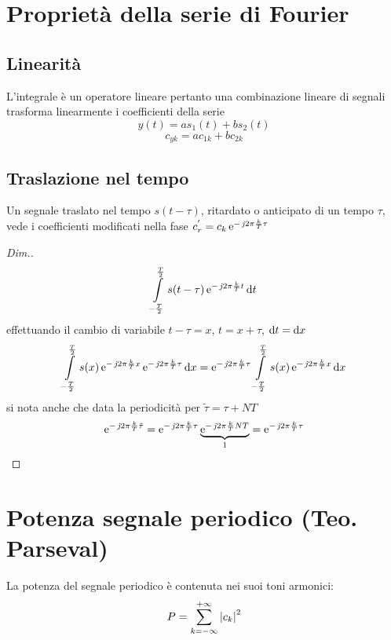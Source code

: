 \section{Proprietà della serie di Fourier}
\subsection{Linearità}L'integrale è un operatore lineare pertanto una combinazione lineare di segnali trasforma linearmente i coefficienti della serie
\[ y(t)=a s_1(t)+ b s_2(t)\]
\[ c_{y k}= a c_{1 k} + b c_{2 k} \]

\subsection{Traslazione nel tempo}
Un segnale traslato nel tempo $s(t-\tau)$, ritardato o anticipato di un tempo $\tau$, vede i coefficienti modificati nella fase $c_r^{'}=c_k \operatorname{e}^{-\operatorname{\mathit{j}\!} 2\pi\frac{k}{T}\tau}$

\begin{proof}[Dim.]
\[ \int\limits_{-\frac{T}{2}}^{\frac{T}{2}}{s(t-\tau)\operatorname{e}^{-\operatorname{\mathit{j}\!} 2\pi\frac{k}{T}t}}{\,\mathop{}\!\mathrm{d}{t}} \]
effettuando il cambio di variabile $t-\tau=x$, $t=x+\tau$, $\mathop{}\!\mathrm{d} t=\mathop{}\!\mathrm{d} x$
\[\int\limits_{-\frac{T}{2}}^{\frac{T}{2}}{s(x)\operatorname{e}^{-\operatorname{\mathit{j}\!} 2\pi\frac{k}{T}x}\operatorname{e}^{-\operatorname{\mathit{j}\!} 2\pi\frac{k}{T}\tau}}{\,\mathop{}\!\mathrm{d}{x}} =
\operatorname{e}^{-\operatorname{\mathit{j}\!} 2\pi\frac{k}{T}\tau} \int\limits_{-\frac{T}{2}}^{\frac{T}{2}}{s(x)\operatorname{e}^{-\operatorname{\mathit{j}\!} 2\pi\frac{k}{T}x}}{\,\mathop{}\!\mathrm{d}{x}}\]
si nota anche che data la periodicità per $\tilde{\tau}=\tau+N T$
\[\operatorname{e}^{-\operatorname{\mathit{j}\!} 2\pi\frac{k}{T}\tilde{\tau}}=
\operatorname{e}^{-\operatorname{\mathit{j}\!} 2\pi\frac{k}{T}\tau} \underbrace{\operatorname{e}^{-\operatorname{\mathit{j}\!} 2\pi\frac{k}{T}N T}}_{1}=\operatorname{e}^{-\operatorname{\mathit{j}\!} 2\pi\frac{k}{T}\tau}
\]
\end{proof}

\section{Potenza segnale periodico (Teo. Parseval)}
La potenza del segnale periodico è contenuta nei suoi toni armonici:
\begin{equation}\label{eq:teo_Parseval}\index{Teorema!Parseval}
P=\sum_{k=-\infty}^{+\infty}{\abs{c_k}^2}
\end{equation}

